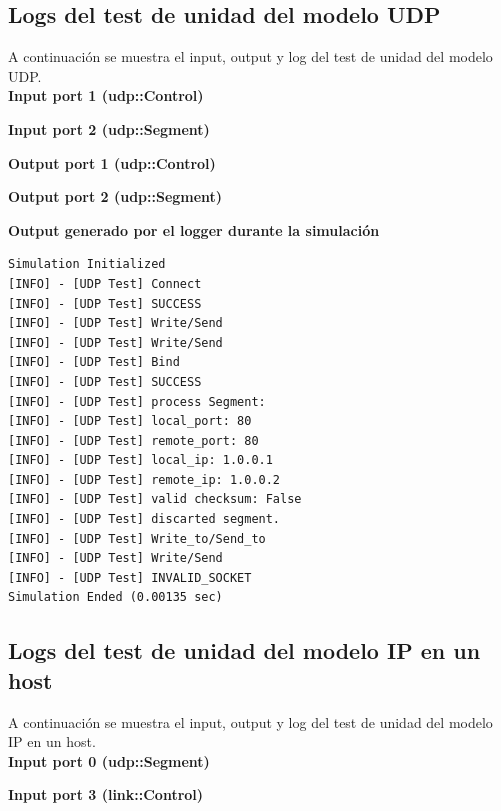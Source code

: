 \documentclass[10pt,a4paper]{article}
\begin{document}
\newpage

\subsection{Logs del test de unidad del modelo UDP}
\label{appendix: udp unit test}
A continuación se muestra el input, output y log del test de unidad del modelo UDP.\\

\textbf{Input port 1 (udp::Control)}


\textbf{Input port 2 (udp::Segment)}


\textbf{Output port 1 (udp::Control)}


\textbf{Output port 2 (udp::Segment)}


\textbf{Output generado por el logger durante la simulación}
\begin{lstlisting}
Simulation Initialized
[INFO] - [UDP Test] Connect
[INFO] - [UDP Test] SUCCESS
[INFO] - [UDP Test] Write/Send
[INFO] - [UDP Test] Write/Send
[INFO] - [UDP Test] Bind
[INFO] - [UDP Test] SUCCESS
[INFO] - [UDP Test] process Segment: 
[INFO] - [UDP Test] local_port: 80
[INFO] - [UDP Test] remote_port: 80
[INFO] - [UDP Test] local_ip: 1.0.0.1
[INFO] - [UDP Test] remote_ip: 1.0.0.2
[INFO] - [UDP Test] valid checksum: False
[INFO] - [UDP Test] discarted segment.
[INFO] - [UDP Test] Write_to/Send_to
[INFO] - [UDP Test] Write/Send
[INFO] - [UDP Test] INVALID_SOCKET
Simulation Ended (0.00135 sec)
\end{lstlisting}

\newpage

\subsection{Logs del test de unidad del modelo IP en un host}
\label{appendix: ip_host unit test}
A continuación se muestra el input, output y log del test de unidad del modelo IP en un host.\\

\textbf{Input port 0 (udp::Segment)}


\textbf{Input port 3 (link::Control)}

\end{document}
